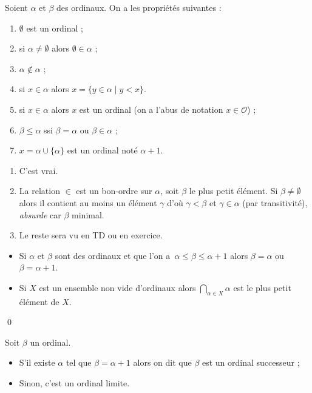 \documentclass[./main]{subfiles}
\begin{document}
  \begin{prop}
    Soient $\alpha$  et $\beta$ des ordinaux. On a les propriétés suivantes :
    \begin{enumerate}
      \item $\emptyset$ est un ordinal ;
      \item si $\alpha \neq \emptyset$ alors $\emptyset \in \alpha$ ;
      \item $\alpha \not \in \alpha$ ;
      \item si $x \in \alpha$ alors $x = \{y \in \alpha  \mid y < x\}$.
      \item si $x \in \alpha$ alors $x$ est un ordinal (on a l'abus de notation $x \in \mathcal{O}$) ;
      \item $\beta \le \alpha$ ssi $\beta = \alpha$ ou  $\beta \in \alpha$ ;
      \item $x = \alpha \cup \{\alpha\}$ est un ordinal noté $\alpha + 1$.
    \end{enumerate}
  \end{prop}

  \begin{prv}
    \begin{enumerate}
      \item C'est vrai.
      \item La relation $\in$ est un bon-ordre sur $\alpha$, soit $\beta$ le plus petit élément.
        Si $\beta \neq \emptyset$ alors il contient au moins un élément $\gamma$ d'où $\gamma < \beta$ et $\gamma \in \alpha$ (par transitivité), \textit{absurde} car $\beta$ minimal.
      \item Le reste sera vu en TD ou en exercice.
    \end{enumerate}
  \end{prv}

  \begin{prop}
    \begin{itemize}
      \item Si $\alpha$ et $\beta$ sont des ordinaux et que l'on a~$\alpha \le \beta \le \alpha + 1$ alors $\beta = \alpha$ ou  $\beta = \alpha + 1$.
      \item Si $X$ est un ensemble non vide d'ordinaux alors $\bigcap_{\alpha \in X} \alpha$ est le plus petit élément de $X$.
    \end{itemize}
    \qed
  \end{prop}

  \begin{defn}
    Soit $\beta$ un ordinal.
    \begin{itemize}
      \item S'il existe $\alpha$ tel que $\beta = \alpha + 1$ alors on dit que $\beta$ est un ordinal successeur ;
      \item Sinon, c'est un ordinal limite.
    \end{itemize}
  \end{defn}
\end{document}
